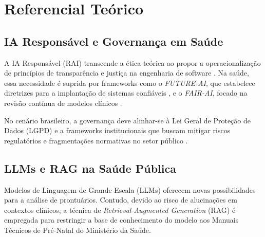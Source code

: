 \documentclass[12pt]{article}
\begin{document}
\section{Referencial Teórico}

\subsection{IA Responsável e Governança em Saúde}
A IA Responsável (RAI) transcende a ética teórica ao propor a operacionalização de princípios de transparência e justiça na engenharia de software \cite{Shneiderman2021, Dignum2022}. Na saúde, essa necessidade é suprida por frameworks como o \textit{FUTURE-AI}, que estabelece diretrizes para a implantação de sistemas confiáveis \cite{Lekadir2023}, e o \textit{FAIR-AI}, focado na revisão contínua de modelos clínicos \cite{Lekadir2022}.

No cenário brasileiro, a governança deve alinhar-se à Lei Geral de Proteção de Dados (LGPD) e a frameworks institucionais que buscam mitigar riscos regulatórios e fragmentações normativas no setor público \cite{Atheniense2024, FrameworkGovBR2025}.

\subsection{LLMs e RAG na Saúde Pública}
Modelos de Linguagem de Grande Escala (LLMs) oferecem novas possibilidades para a análise de prontuários. Contudo, devido ao risco de alucinações em contextos clínicos, a técnica de \textit{Retrieval-Augmented Generation} (RAG) é empregada para restringir a base de conhecimento do modelo aos Manuais Técnicos de Pré-Natal do Ministério da Saúde.
\end{document}

